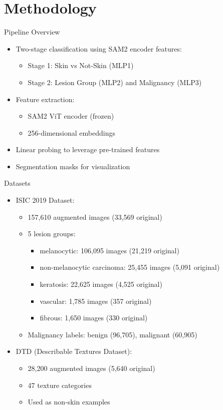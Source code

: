 \documentclass[aspectratio=169]{beamer}
\begin{document}
\section{Methodology}

\begin{frame}{Pipeline Overview}
  \begin{itemize}
    \item Two-stage classification using SAM2 encoder features:
      \begin{itemize}
        \item Stage 1: Skin vs Not-Skin (MLP1)
        \item Stage 2: Lesion Group (MLP2) and Malignancy (MLP3)
      \end{itemize}
    \item Feature extraction:
      \begin{itemize}
        \item SAM2 ViT encoder (frozen)
        \item 256-dimensional embeddings
      \end{itemize}
    \item Linear probing to leverage pre-trained features
    \item Segmentation masks for visualization
  \end{itemize}
\end{frame}

\begin{frame}{Datasets}
  \begin{itemize}
    \item ISIC 2019 Dataset:
      \begin{itemize}
        \item 157,610 augmented images (33,569 original)
        \item 5 lesion groups:
          \begin{itemize}
            \item melanocytic: 106,095 images (21,219 original)
            \item non-melanocytic carcinoma: 25,455 images (5,091 original)
            \item keratosis: 22,625 images (4,525 original)
            \item vascular: 1,785 images (357 original)
            \item fibrous: 1,650 images (330 original)
          \end{itemize}
        \item Malignancy labels: benign (96,705), malignant (60,905)
      \end{itemize}
    \item DTD (Describable Textures Dataset):
      \begin{itemize}
        \item 28,200 augmented images (5,640 original)
        \item 47 texture categories
        \item Used as non-skin examples
      \end{itemize}
  \end{itemize}
\end{frame}
\end{document}
